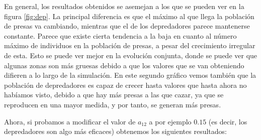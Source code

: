 \documentclass[11pt,a4paper]{article}
\begin{document}
En general, los resultados obtenidos se asemejan a los que se pueden ver en la figura
\ref{fig:dep}. La principal diferencia es que el máximo al que llega la población de
presas va cambiando, mientras que el de los depredadores parece mantenerse constante.
Parece que existe cierta tendencia a la baja en cuanto al número máximo de individuos
en la población de presas, a pesar del crecimiento irregular de esta. Esto se puede
ver mejor en la evolución conjunta, donde se puede ver que algunas zonas son más gruesas
debido a que los valores que se van obteniendo difieren a lo largo de la simulación.
En este segundo gráfico vemos también que la población de depredadores es capaz de crecer
hasta valores que hasta ahora no habíamos visto, debido a que hay más presas a las que
cazar, ya que se reproducen en una mayor medida, y por tanto, se generan más presas.

Ahora, si probamos a modificar el valor de $a_{12}$ a por ejemplo $0.15$ (es decir,
los depredadores son algo más eficaces) obtenemos los siguientes resultados:
\end{document}
